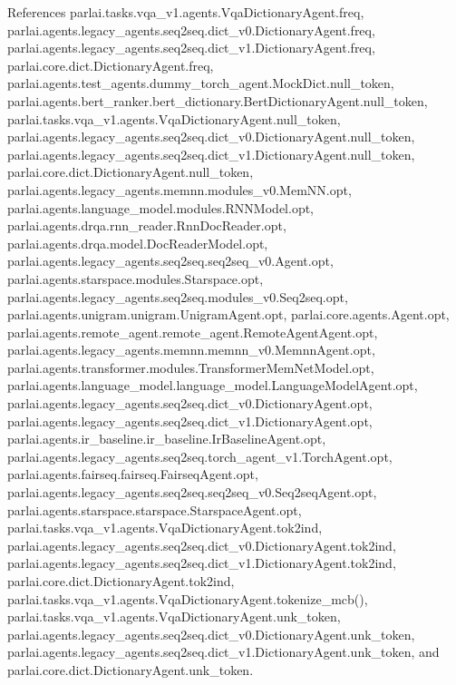References parlai.\+tasks.\+vqa\+\_\+v1.\+agents.\+Vqa\+Dictionary\+Agent.\+freq, parlai.\+agents.\+legacy\+\_\+agents.\+seq2seq.\+dict\+\_\+v0.\+Dictionary\+Agent.\+freq, parlai.\+agents.\+legacy\+\_\+agents.\+seq2seq.\+dict\+\_\+v1.\+Dictionary\+Agent.\+freq, parlai.\+core.\+dict.\+Dictionary\+Agent.\+freq, parlai.\+agents.\+test\+\_\+agents.\+dummy\+\_\+torch\+\_\+agent.\+Mock\+Dict.\+null\+\_\+token, parlai.\+agents.\+bert\+\_\+ranker.\+bert\+\_\+dictionary.\+Bert\+Dictionary\+Agent.\+null\+\_\+token, parlai.\+tasks.\+vqa\+\_\+v1.\+agents.\+Vqa\+Dictionary\+Agent.\+null\+\_\+token, parlai.\+agents.\+legacy\+\_\+agents.\+seq2seq.\+dict\+\_\+v0.\+Dictionary\+Agent.\+null\+\_\+token, parlai.\+agents.\+legacy\+\_\+agents.\+seq2seq.\+dict\+\_\+v1.\+Dictionary\+Agent.\+null\+\_\+token, parlai.\+core.\+dict.\+Dictionary\+Agent.\+null\+\_\+token, parlai.\+agents.\+legacy\+\_\+agents.\+memnn.\+modules\+\_\+v0.\+Mem\+N\+N.\+opt, parlai.\+agents.\+language\+\_\+model.\+modules.\+R\+N\+N\+Model.\+opt, parlai.\+agents.\+drqa.\+rnn\+\_\+reader.\+Rnn\+Doc\+Reader.\+opt, parlai.\+agents.\+drqa.\+model.\+Doc\+Reader\+Model.\+opt, parlai.\+agents.\+legacy\+\_\+agents.\+seq2seq.\+seq2seq\+\_\+v0.\+Agent.\+opt, parlai.\+agents.\+starspace.\+modules.\+Starspace.\+opt, parlai.\+agents.\+legacy\+\_\+agents.\+seq2seq.\+modules\+\_\+v0.\+Seq2seq.\+opt, parlai.\+agents.\+unigram.\+unigram.\+Unigram\+Agent.\+opt, parlai.\+core.\+agents.\+Agent.\+opt, parlai.\+agents.\+remote\+\_\+agent.\+remote\+\_\+agent.\+Remote\+Agent\+Agent.\+opt, parlai.\+agents.\+legacy\+\_\+agents.\+memnn.\+memnn\+\_\+v0.\+Memnn\+Agent.\+opt, parlai.\+agents.\+transformer.\+modules.\+Transformer\+Mem\+Net\+Model.\+opt, parlai.\+agents.\+language\+\_\+model.\+language\+\_\+model.\+Language\+Model\+Agent.\+opt, parlai.\+agents.\+legacy\+\_\+agents.\+seq2seq.\+dict\+\_\+v0.\+Dictionary\+Agent.\+opt, parlai.\+agents.\+legacy\+\_\+agents.\+seq2seq.\+dict\+\_\+v1.\+Dictionary\+Agent.\+opt, parlai.\+agents.\+ir\+\_\+baseline.\+ir\+\_\+baseline.\+Ir\+Baseline\+Agent.\+opt, parlai.\+agents.\+legacy\+\_\+agents.\+seq2seq.\+torch\+\_\+agent\+\_\+v1.\+Torch\+Agent.\+opt, parlai.\+agents.\+fairseq.\+fairseq.\+Fairseq\+Agent.\+opt, parlai.\+agents.\+legacy\+\_\+agents.\+seq2seq.\+seq2seq\+\_\+v0.\+Seq2seq\+Agent.\+opt, parlai.\+agents.\+starspace.\+starspace.\+Starspace\+Agent.\+opt, parlai.\+tasks.\+vqa\+\_\+v1.\+agents.\+Vqa\+Dictionary\+Agent.\+tok2ind, parlai.\+agents.\+legacy\+\_\+agents.\+seq2seq.\+dict\+\_\+v0.\+Dictionary\+Agent.\+tok2ind, parlai.\+agents.\+legacy\+\_\+agents.\+seq2seq.\+dict\+\_\+v1.\+Dictionary\+Agent.\+tok2ind, parlai.\+core.\+dict.\+Dictionary\+Agent.\+tok2ind, parlai.\+tasks.\+vqa\+\_\+v1.\+agents.\+Vqa\+Dictionary\+Agent.\+tokenize\+\_\+mcb(), parlai.\+tasks.\+vqa\+\_\+v1.\+agents.\+Vqa\+Dictionary\+Agent.\+unk\+\_\+token, parlai.\+agents.\+legacy\+\_\+agents.\+seq2seq.\+dict\+\_\+v0.\+Dictionary\+Agent.\+unk\+\_\+token, parlai.\+agents.\+legacy\+\_\+agents.\+seq2seq.\+dict\+\_\+v1.\+Dictionary\+Agent.\+unk\+\_\+token, and parlai.\+core.\+dict.\+Dictionary\+Agent.\+unk\+\_\+token.

